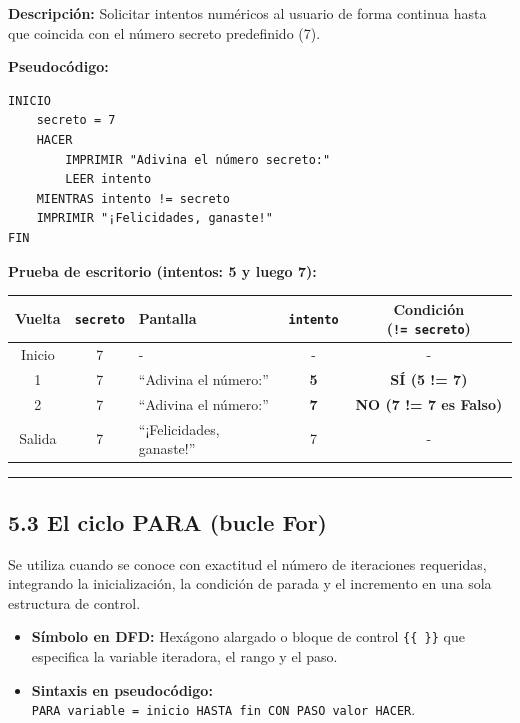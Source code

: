 \textbf{Descripción:} Solicitar intentos numéricos al usuario de forma
continua hasta que coincida con el número secreto predefinido (7).

\textbf{Pseudocódigo:}

\begin{verbatim}
INICIO
    secreto = 7
    HACER
        IMPRIMIR "Adivina el número secreto:"
        LEER intento
    MIENTRAS intento != secreto
    IMPRIMIR "¡Felicidades, ganaste!"
FIN
\end{verbatim}

\textbf{Prueba de escritorio (intentos: 5 y luego 7):}

{\def\LTcaptype{none} %
\begin{longtable}[]{@{}cclcc@{}}
\toprule\noalign{}
Vuelta & \texttt{secreto} & Pantalla & \texttt{intento} & Condición
(\texttt{!=\ secreto}) \\
\midrule\noalign{}
\endhead
\bottomrule\noalign{}
\endlastfoot
Inicio & 7 & - & - & - \\
1 & 7 & ``Adivina el número:'' & \textbf{5} & \textbf{SÍ (5 != 7)} \\
2 & 7 & ``Adivina el número:'' & \textbf{7} & \textbf{NO (7 != 7 es
Falso)} \\
Salida & 7 & ``¡Felicidades, ganaste!'' & 7 & - \\
\end{longtable}
}

\begin{center}\rule{0.5\linewidth}{0.5pt}\end{center}

\subsection{5.3 El ciclo PARA (bucle
For)}\label{el-ciclo-para-bucle-for}

Se utiliza cuando se conoce con exactitud el número de iteraciones
requeridas, integrando la inicialización, la condición de parada y el
incremento en una sola estructura de control.

\begin{itemize}
\tightlist
\item
  \textbf{Símbolo en DFD:} Hexágono alargado o bloque de control
  \texttt{\{\{\ \}\}} que especifica la variable iteradora, el rango y
  el paso.
\item
  \textbf{Sintaxis en pseudocódigo:}
  \texttt{PARA\ variable\ =\ inicio\ HASTA\ fin\ CON\ PASO\ valor\ HACER}.
\end{itemize}

